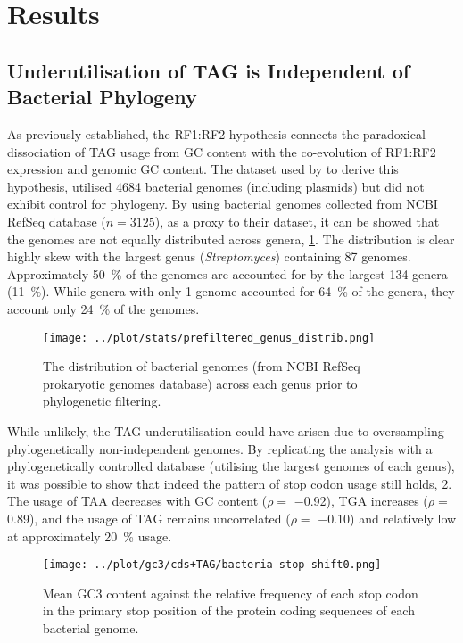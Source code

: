 \documentclass[../main.tex]{subfile}
\begin{document}
 \section{Results}
    \subsection{Underutilisation of TAG is Independent of Bacterial Phylogeny}
        As previously established, the RF1:RF2 hypothesis connects the paradoxical dissociation of TAG usage from GC content with the co-evolution of RF1:RF2 expression and genomic GC content.
        The dataset used by \textcite{Korkmaz2014} to derive this hypothesis, utilised \num{4684} bacterial genomes (including plasmids) but did not exhibit control for phylogeny. By using bacterial genomes collected from NCBI RefSeq database ($n = 3125$), as a proxy to their dataset, it can be showed that the genomes are not equally distributed across genera, \cref{fig:results/dataset/pre}. The distribution is clear highly skew with the largest genus (\textit{Streptomyces}) containing 87 genomes.
        Approximately \SI{50}{\percent} of the genomes are accounted for by the largest \num{134} genera (\SI{11}{\percent}). While genera with only 1 genome accounted for \SI{64}{\percent} of the genera, they account only \SI{24}{\percent} of the genomes.

        \begin{figure}[H]
            \centering
            \texttt{[image: ../plot/stats/prefiltered\_genus\_distrib.png]}
            \caption{%
                The distribution of bacterial genomes (from NCBI RefSeq prokaryotic genomes database) across each genus prior to phylogenetic filtering.
            }
            \label{fig:results/dataset/pre}
        \end{figure}

        While unlikely, the TAG underutilisation could have arisen due to oversampling phylogenetically non-independent genomes. By replicating the analysis with a phylogenetically controlled database (utilising the largest genomes of each genus), it was possible to show that indeed the pattern of stop codon usage still holds, \cref{fig:results/bacteria/protein}. The usage of TAA decreases with GC content ($\rho =$ \num{-0.92}), TGA increases ($\rho =$ \num{0.89}), and the usage of TAG remains uncorrelated ($\rho =$ \num{-0.10}) and relatively low at approximately \SI{20}{\percent} usage.

        \begin{figure}[H]
            \centering
            \texttt{[image: ../plot/gc3/cds+TAG/bacteria-stop-shift0.png]}
            \caption{%
                Mean GC3 content against the relative frequency of each stop codon in the primary stop position of the protein coding sequences of each bacterial genome.
            }
            \label{fig:results/bacteria/protein}
        \end{figure}
\end{document}
